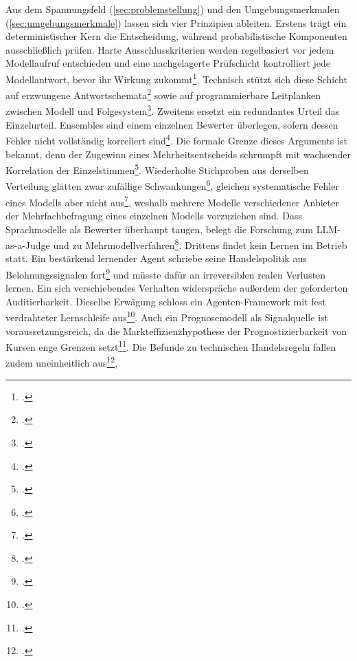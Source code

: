 Aus dem Spannungsfeld (\cref{sec:problemstellung}) und den Umgebungsmerkmalen (\cref{sec:umgebungsmerkmale}) lassen sich vier Prinzipien ableiten. Erstens trägt ein deterministischer
Kern die Entscheidung, während probabilistische Komponenten ausschließlich prüfen.
Harte Ausschlusskriterien werden regelbasiert vor jedem Modellaufruf entschieden
und eine nachgelagerte Prüfschicht kontrolliert jede Modellantwort, bevor ihr Wirkung
zukommt\footcite[vgl.][S.~135]{gollnick2025}. Technisch stützt sich diese Schicht auf
erzwungene Antwortschemata\footcites[vgl.][S.~10932--10952]{gengGcd2023}[vgl.][]{openaiStructured2026}[vgl.][]{anthropicStructured2026}[vgl.][]{geminiStructured2026}
sowie auf programmierbare Leitplanken zwischen Modell und
Folgesystem\footcite[vgl.][S.~431--445]{rebedeaNemo2023}. Zweitens ersetzt ein
redundantes Urteil das Einzelurteil. Ensembles sind einem einzelnen Bewerter
überlegen, sofern dessen Fehler nicht vollständig korreliert
sind\footcites[vgl.][S.~1--15]{dietterich2000}[vgl.][Kap.~8]{kuncheva2014}. Die
formale Grenze dieses Arguments ist bekannt, denn der Zugewinn eines
Mehrheitsentscheids schrumpft mit wachsender Korrelation der
Einzelstimmen\footcites[vgl.][S.~617\,f.]{ladha1992}[vgl.][S.~261--278]{grofman1983}.
Wiederholte Stichproben aus derselben Verteilung glätten zwar zufällige Schwankungen\footcite[vgl.][]{wang2023selfconsistency}, gleichen systematische Fehler eines Modells aber nicht aus\footcite[vgl.][S.~167]{gollnick2025}, weshalb mehrere Modelle verschiedener Anbieter der Mehrfachbefragung eines einzelnen Modells vorzuziehen sind. Dass Sprachmodelle als Bewerter überhaupt taugen, belegt
die Forschung zum \foreignlanguage{english}{LLM-as-a-Judge} und zu
Mehrmodellverfahren\footcites[vgl.][S.~46595--46623]{zheng2023judge}[vgl.][S.~11733--11763]{du2024debate}.
Drittens findet kein Lernen im Betrieb statt. Ein bestärkend lernender Agent schriebe
seine Handelspolitik aus Belohnungssignalen
fort\footcite[vgl.][Kap.~1]{suttonBarto2018} und müsste dafür an irreversiblen realen
Verlusten lernen. Ein sich verschiebendes Verhalten widerspräche außerdem der
geforderten Auditierbarkeit. Dieselbe Erwägung schloss ein Agenten-Framework mit fest
verdrahteter Lernschleife aus\footcites[vgl.][]{hermesAgent2026}[vgl.][S.~8634--8652]{shinn2023reflexion}.
Auch ein Prognosemodell als Signalquelle ist voraussetzungsreich, da die
Markteffizienzhypothese der Prognostizierbarkeit von Kursen enge Grenzen
setzt\footcites[vgl.][S.~383--417]{fama1970}[vgl.][S.~59--82]{malkiel2003}. Die
Befunde zu technischen Handelsregeln fallen zudem
uneinheitlich aus\footcites[vgl.][S.~1731--1764]{brock1992}[vgl.][S.~1647--1691]{sullivan1999}[vgl.][S.~786--826]{park2007},

